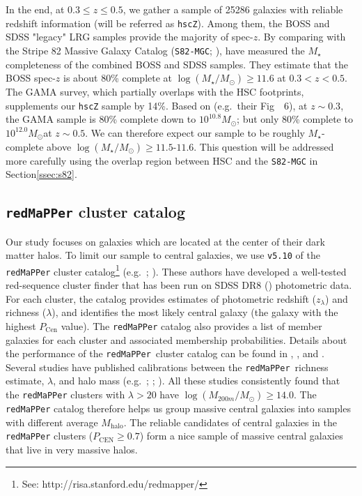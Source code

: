 \documentclass[a4paper,fleqn,usenatbib]{mnras}
\def\msun{$M_\odot$}
\def\redm{\texttt{redMaPPer}}
\def\mstar{{$M_{\star}$}}
\def\mhalo{{$M_{\mathrm{halo}}$}}
\def\logms{{$\log (M_{\star}/M_{\odot})$}}
\begin{document}
    In the end, at $0.3 \leq z \leq 0.5$, we gather a sample of 25286 galaxies with 
    reliable redshift information (will be referred as \texttt{hscZ}).
    Among them, the BOSS and SDSS "legacy" LRG samples provide the majority of 
    spec-$z$. 
    By comparing with the Stripe 82 Massive Galaxy Catalog
    (\texttt{S82-MGC}; \citealt{Bundy2015}), \citet{Leauthaud2016} have measured the
    \mstar{} completeness of the combined BOSS and SDSS samples. 
    They estimate that the BOSS spec-$z$ is about 80\% complete at \logms{}$\geq 11.6$ 
    at $0.3 < z < 0.5$. 
    The GAMA survey, which partially overlaps with the HSC footprints, supplements 
    our \texttt{hscZ} sample by 14\%. 
    Based on \citet{Taylor2011} (e.g.\ their Fig~~6), at $z\sim 0.3$, the GAMA 
    sample is 80\% complete down to $10^{10.8}$\msun; but only 80\% complete to 
    $10^{12.0}$\msun at $z\sim 0.5$. 
    We can therefore expect our sample to be roughly \mstar{}-complete above 
    \logms{}$\geq 11.5$-$11.6$. 
    This question will be addressed more carefully using the overlap region between 
    HSC and the \texttt{S82-MGC} in Section\ref{ssec:s82}.

\subsection{\redm{}{} cluster catalog}
    \label{ssec:redmapper}
    
    Our study focuses on galaxies which are located at the center of their dark matter 
    halos. 
    To limit our sample to central galaxies, we use \texttt{v5.10} of the \redm{}{} 
    cluster catalog\footnote{See: http://risa.stanford.edu/redmapper/} 
    (e.g.\ \citealt{Rykoff2014}; \citealt{Rozo2015b}). 
    These authors have developed a well-tested red-sequence cluster finder that has 
    been run on SDSS DR8 (\citealt{SDSSDR8}) photometric data. 
    For each cluster, the catalog provides estimates of photometric redshift 
    ($z_{\lambda}$) and richness ($\lambda$), and identifies the most likely central
    galaxy (the galaxy with the highest $P_{\mathrm{Cen}}$ value). 
    The \redm{}{} catalog also provides a list of member galaxies for each cluster 
    and associated membership probabilities. 
    Details about the performance of the \redm{}~cluster catalog can be found in 
    \citet{Rozo2014}, \citet{Rozo2015a}, and \citet{Rozo2015b}. 
    Several studies have published calibrations between the \redm{}~richness estimate, 
    $\lambda$, and halo mass (e.g.\ \citealt{Saro2015}; \citealt{Farahi2016}; 
    \citealt{Simet2016}). 
    All these studies consistently found that the \redm{} clusters with $\lambda > 20$ 
    have $\log (M_{200m}/M_{\odot}) \geq 14.0$.
    The \redm{} catalog therefore helps us group massive central galaxies into samples 
    with different average \mhalo{}. 
    The reliable candidates of central galaxies in the \redm{} clusters 
    ($P_{\mathrm{CEN}} \geq 0.7$) form a nice sample of massive central galaxies 
    that live in very massive halos. 
    
\end{document}
